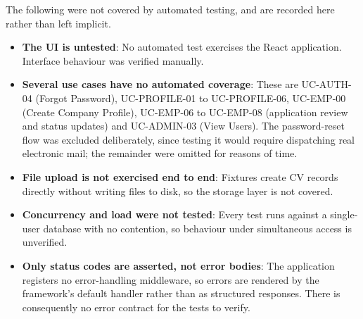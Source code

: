 The following were not covered by automated testing, and are recorded here rather than left implicit.
\begin{itemize}
	\item \textbf{The UI is untested}: No automated test exercises the React application. Interface behaviour was verified manually.
	\item \textbf{Several use cases have no automated coverage}: These are UC-AUTH-04 (Forgot Password), UC-PROFILE-01 to UC-PROFILE-06, UC-EMP-00 (Create Company Profile), UC-EMP-06 to UC-EMP-08 (application review and status updates) and UC-ADMIN-03 (View Users). The password-reset flow was excluded deliberately, since testing it would require dispatching real electronic mail; the remainder were omitted for reasons of time.
	\item \textbf{File upload is not exercised end to end}: Fixtures create CV records directly without writing files to disk, so the storage layer is not covered.
	\item \textbf{Concurrency and load were not tested}: Every test runs against a single-user database with no contention, so behaviour under simultaneous access is unverified.
	\item \textbf{Only status codes are asserted, not error bodies}: The application registers no error-handling middleware, so errors are rendered by the framework's default handler rather than as structured responses. There is consequently no error contract for the tests to verify.
\end{itemize}